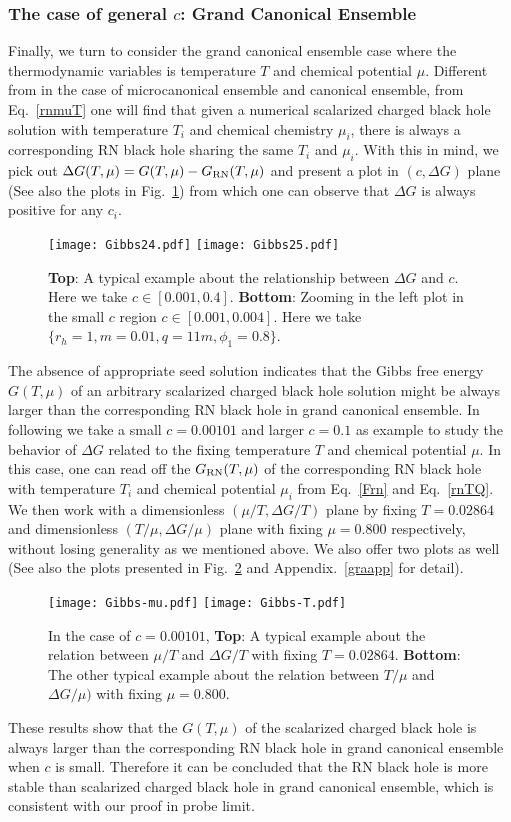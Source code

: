 \documentclass[pr, twocolumn, preprintnumbers, showpacs,footnoteadded, superscriptaddress,nofootinbib,longbibliography]{revtex4-1}
\begin{document}
\subsubsection{The case of general $c$: Grand Canonical Ensemble}
Finally, we turn to consider the grand canonical ensemble case where the thermodynamic variables is temperature $T$ and chemical potential $\mu$. Different from in the case of microcanonical ensemble and canonical ensemble, from Eq.~\eqref{rnmuT} one will find that given a numerical scalarized charged black hole solution with temperature $T_i$ and chemical chemistry $\mu_i$, there is always a corresponding RN black hole sharing the same $T_i$ and $\mu_i$. With this in mind, we pick out $\Delta G(T, \mu)= G(T, \mu)-G_{\rm RN} (T,\mu)$ and present a plot in $(c, \Delta G)$ plane (See also the plots in Fig.~\ref{cG}) from which one can observe that $\Delta G$ is always positive for any $c_{i}$.
%
\begin{figure}[htpb]
  \centering
  \texttt{[image: Gibbs24.pdf]}
  \texttt{[image: Gibbs25.pdf]}
 \caption{\textbf{Top}: A typical example about the relationship between $\Delta G$ and $c$. Here we take $c \in [0.001, 0.4]$.
 \textbf{Bottom}: Zooming in the left plot in the small $c$ region $c \in [0.001, 0.004]$. Here we take $\{r_h=1, m=0.01, q=11m, \phi_1=0.8\}$.}\label{cG}
\end{figure}
%
The absence of appropriate seed solution indicates that the Gibbs free energy $G(T, \mu)$ of an arbitrary scalarized charged black hole solution might be always larger than the corresponding RN black hole in grand canonical ensemble. In following we take a small $c=0.00101$ and larger $c=0.1$ as example to study the behavior of $\Delta G$ related to the fixing temperature $T$ and chemical potential $\mu$. In this case, one can read off the $G_{\rm RN}(T, \mu)$ of the corresponding RN black hole with temperature $T_i$ and chemical potential $\mu_i$ from Eq.~\eqref{Frn} and Eq.~\eqref{rnTQ}. We then work with a dimensionless $(\mu/T, \Delta G/T)$ plane by fixing $T=0.02864$ and dimensionless $(T/\mu, \Delta G/ \mu)$ plane with fixing $\mu=0.800$ respectively, without losing generality as we mentioned above. We also offer two plots as well (See also the plots presented in Fig.~\ref{GTmu} and Appendix.~\ref{graapp} for detail).
%
\begin{figure}[htpb]
  \centering
  \texttt{[image: Gibbs-mu.pdf]}
  \texttt{[image: Gibbs-T.pdf]}
 \caption{In the case of $c=0.00101$, \textbf{Top}:  A typical example about the relation between $\mu/T$ and $\Delta G/T$ with fixing $T=0.02864$. \textbf{Bottom}: The other typical example about the relation between $T/\mu $ and $\Delta G/\mu)$ with fixing $\mu=0.800$. }\label{GTmu}
\end{figure}
%
These results show that the $G(T,\mu)$ of the scalarized charged black hole is always larger than the corresponding RN black hole in grand canonical ensemble when $c$ is small. Therefore it can be concluded that the RN black hole is more stable than scalarized charged black hole in grand canonical ensemble, which is consistent with our proof in probe limit.
\end{document}
